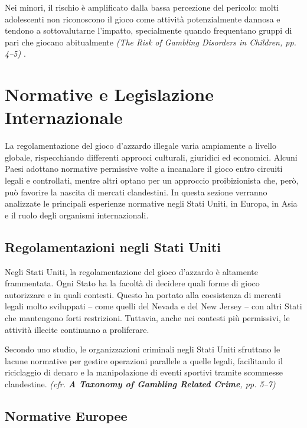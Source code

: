 \documentclass[a4paper,12pt]{article}
\begin{document}
Nei minori, il rischio è amplificato dalla bassa percezione del pericolo: molti adolescenti non riconoscono il gioco come attività potenzialmente dannosa e tendono a sottovalutarne l’impatto, specialmente quando frequentano gruppi di pari che giocano abitualmente \textit{(The Risk of Gambling Disorders in Children, pp. 4--5)} \cite{ferrara2019childrenrisk}.




\section{Normative e Legislazione Internazionale}

La regolamentazione del gioco d’azzardo illegale varia ampiamente a livello globale, rispecchiando differenti approcci culturali, giuridici ed economici. Alcuni Paesi adottano normative permissive volte a incanalare il gioco entro circuiti legali e controllati, mentre altri optano per un approccio proibizionista che, però, può favorire la nascita di mercati clandestini. In questa sezione verranno analizzate le principali esperienze normative negli Stati Uniti, in Europa, in Asia e il ruolo degli organismi internazionali.

\subsection{Regolamentazioni negli Stati Uniti}

Negli Stati Uniti, la regolamentazione del gioco d’azzardo è altamente frammentata. Ogni Stato ha la facoltà di decidere quali forme di gioco autorizzare e in quali contesti. Questo ha portato alla coesistenza di mercati legali molto sviluppati – come quelli del Nevada e del New Jersey – con altri Stati che mantengono forti restrizioni. Tuttavia, anche nei contesti più permissivi, le attività illecite continuano a proliferare.

Secondo uno studio, le organizzazioni criminali negli Stati Uniti sfruttano le lacune normative per gestire operazioni parallele a quelle legali, facilitando il riciclaggio di denaro e la manipolazione di eventi sportivi tramite scommesse clandestine. \textit{(cfr. \textbf{A Taxonomy of Gambling Related Crime}, pp. 5--7)} \cite{banks2018taxonomy}

\subsection{Normative Europee}
\end{document}
